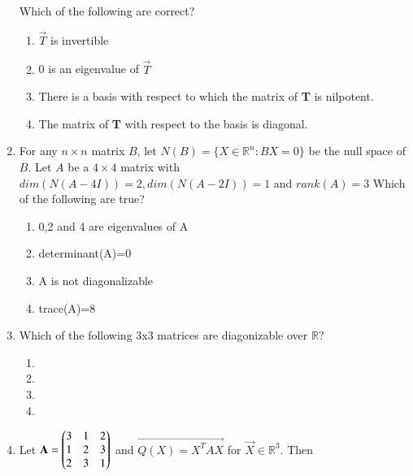 \begin{enumerate}[label=\thesection.\arabic*.,ref=\thesection.\theenumi]
Which of the following are correct?\\
\begin{enumerate}
\item $\vec{T}$ is invertible
\item 0 is an eigenvalue of $\vec{T}$
\item There is a basis with respect to which the matrix of \textbf{T} is nilpotent.
\item The matrix of \textbf{T} with respect to the basis  is diagonal.
\end{enumerate}
\solution

\item For any $n\times n$ matrix $B$, let $N(B)=\{X\in \mathbb{R}^n:BX=0\}$ be the null space of $B$. Let $A$ be a $4\times 4$ matrix with $dim(N(A-4I))=2, dim(N(A-2I))=1$ and $rank(A)=3$
Which of the following are true?
\begin{enumerate}
\item 0,2 and 4 are eigenvalues of A
\item determinant(A)=0
\item A is not diagonalizable
\item trace(A)=8
\end{enumerate}
%
\solution

\item Which of the following 3x3 matrices are diagonizable over $\mathbb{R}?$\\
\begin{enumerate}
    \item {}
    \item {}
    \item {}
    \item {}
\end{enumerate}
%
\solution

\twocolumn
\item Let $\mathbf{A} = \begin{pmatrix}3 & 1 & 2 \\ 1 & 2 & 3 \\ 2 & 3 & 1  \end{pmatrix}$ and $\vec{Q(X) = X^TAX}$ for $\vec{X} \in \mathbb{R}^{3}$. Then
\begin{enumerate}

\end{enumerate}
\end{enumerate}
